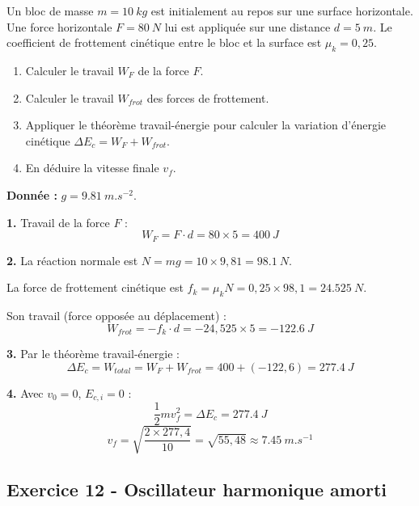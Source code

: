 \documentclass[12pt,a4paper]{article}
\begin{document}
\begin{boiteexercice}
Un bloc de masse $m = \qty{10}{kg}$ est initialement au repos sur une surface horizontale. Une force horizontale $F = \qty{80}{N}$ lui est appliquée sur une distance $d = \qty{5}{m}$. Le coefficient de frottement cinétique entre le bloc et la surface est $\mu_k = 0{,}25$.
\begin{enumerate}
  \item Calculer le travail $W_F$ de la force $F$.
  \item Calculer le travail $W_{frot}$ des forces de frottement.
  \item Appliquer le théorème travail-énergie pour calculer la variation d'énergie cinétique $\Delta E_c = W_F + W_{frot}$.
  \item En déduire la vitesse finale $v_f$.
\end{enumerate}
\textbf{Donnée :} $g = \qty{9.81}{m.s^{-2}}$.
\end{boiteexercice}

\begin{boitecorrige}
\textbf{1.} Travail de la force $F$ :
\[
W_F = F\cdot d = 80\times5 = \qty{400}{J}
\]

\textbf{2.} La réaction normale est $N = mg = 10\times9{,}81 = \qty{98.1}{N}$.

La force de frottement cinétique est $f_k = \mu_k N = 0{,}25\times98{,}1 = \qty{24.525}{N}$.

Son travail (force opposée au déplacement) :
\[
W_{frot} = -f_k\cdot d = -24{,}525\times5 = \qty{-122.6}{J}
\]

\textbf{3.} Par le théorème travail-énergie :
\[
\Delta E_c = W_{total} = W_F + W_{frot} = 400 + (-122{,}6) = \qty{277.4}{J}
\]

\textbf{4.} Avec $v_0 = 0$, $E_{c,i} = 0$ :
\[
\frac{1}{2}mv_f^2 = \Delta E_c = \qty{277.4}{J}
\]
\[
v_f = \sqrt{\frac{2\times277{,}4}{10}} = \sqrt{55{,}48} \approx \qty{7.45}{m.s^{-1}}
\]
\end{boitecorrige}

\subsection*{Exercice 12 - Oscillateur harmonique amorti \niveau{\difficile}}
\end{document}
